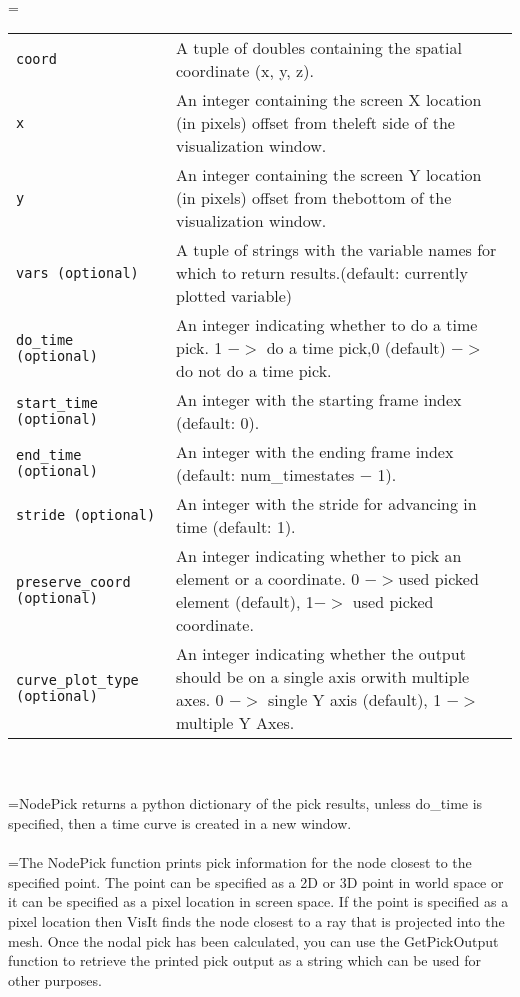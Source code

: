 \documentclass[10pt,a4paper]{report}
\begin{document}
 \\ 
\hangindent=\parindent 
\begin{tabular}{lp{9cm}}
\verb!coord! & A tuple of doubles containing the spatial coordinate (x, y, z). \\
\verb!x! & An integer containing the screen X location (in pixels) offset from theleft side of the visualization window. \\
\verb!y! & An integer containing the screen Y location (in pixels) offset from thebottom of the visualization window. \\
\verb!vars (optional)! & A tuple of strings with the variable names for which to return results.(default: currently plotted variable) \\
\verb!do_time (optional)! & An integer indicating whether to do a time pick. 1 $-$$>$ do a time pick,0 (default) $-$$>$ do not do a time pick. \\
\verb!start_time (optional)! & An integer with the starting frame index (default: 0). \\
\verb!end_time (optional)! & An integer with the ending frame index (default: num\_timestates $-$ 1). \\
\verb!stride (optional)! & An integer with the stride for advancing in time (default: 1). \\
\verb!preserve_coord (optional)! & An integer indicating whether to pick an element or a coordinate. 0 $-$$>$used picked element (default), 1$-$$>$ used picked coordinate. \\
\verb!curve_plot_type (optional)! & An integer indicating whether the output should be on a single axis orwith multiple axes. 0 $-$$>$ single Y axis (default), 1 $-$$>$ multiple Y Axes. \\
\end{tabular} \\[-2mm]


 \\ 
\hangindent=\parindent NodePick returns a python dictionary of the pick results, unless do\_time is specified, then a time curve is created in a new window. \\[-3mm] 

 \\ 
\hangindent=\parindent The NodePick function prints pick information for the node closest to the specified point. The point can be specified as a 2D or 3D point in world space or it can be specified as a pixel location in screen space. If the point is specified as a pixel location then VisIt finds the node closest to a ray that is projected into the mesh. Once the nodal pick has been calculated, you can use the GetPickOutput function to retrieve the printed pick output as a string which can be used for other purposes. \\[-3mm] 
\end{document}
